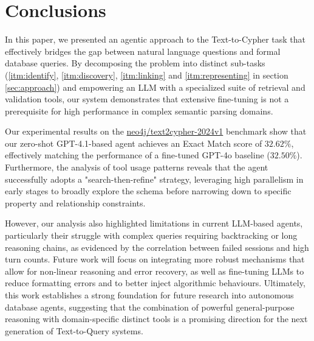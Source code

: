 \section{Conclusions}

In this paper, we presented an agentic approach to the Text-to-Cypher task that effectively bridges the gap between natural language questions and formal database queries. By decomposing the problem into distinct sub-tasks (\ref{itm:identify}, \ref{itm:discovery}, \ref{itm:linking} and \ref{itm:representing} in section \ref{sec:approach}) and empowering an LLM with a specialized suite of retrieval and validation tools, our system demonstrates that extensive fine-tuning is not a prerequisite for high performance in complex semantic parsing domains.

Our experimental results on the \href{https://huggingface.co/datasets/neo4j/text2cypher-2024v1}{neo4j/text2cypher-2024v1} benchmark show that our zero-shot GPT-4.1-based agent achieves an Exact Match score of $32.62\%$, effectively matching the performance of a fine-tuned GPT-4o baseline ($32.50\%$). Furthermore, the analysis of tool usage patterns reveals that the agent successfully adopts a "search-then-refine" strategy, leveraging high parallelism in early stages to broadly explore the schema before narrowing down to specific property and relationship constraints.

However, our analysis also highlighted limitations in current LLM-based agents, particularly their struggle with complex queries requiring backtracking or long reasoning chains, as evidenced by the correlation between failed sessions and high turn counts. Future work will focus on integrating more robust mechanisms that allow for non-linear reasoning and error recovery, as well as fine-tuning LLMs to reduce formatting errors and to better inject algorithmic behaviours. Ultimately, this work establishes a strong foundation for future research into autonomous database agents, suggesting that the combination of powerful general-purpose reasoning with domain-specific distinct tools is a promising direction for the next generation of Text-to-Query systems.
